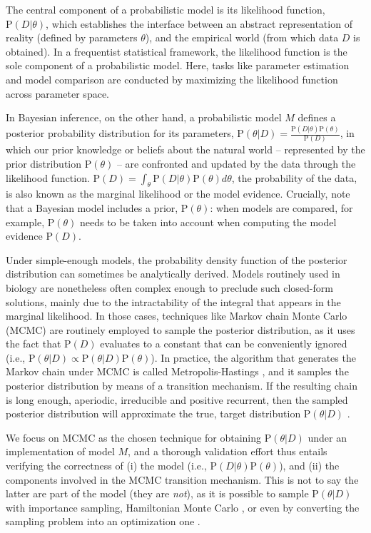 \documentclass[oneside]{article}
\begin{document}
The central component of a probabilistic model is its likelihood
function, $\text{P}(D|\theta)$, which establishes the
interface between an abstract representation of reality (defined by parameters $\theta$), and the
empirical world (from which data $D$ is obtained).
In a frequentist statistical framework, the likelihood function is the sole
component of a probabilistic model.
Here, tasks like parameter estimation and model comparison are conducted
by maximizing the likelihood function across parameter
space.

In Bayesian inference, on the other hand, a probabilistic model $M$
defines a posterior probability distribution for its parameters,
$\text{P}(\theta|D) = \frac{\text{P}(D|\theta)\text{P}(\theta)}{\text{P}(D)}$, in which our prior
knowledge or beliefs about the natural world -- represented by the prior
distribution $\text{P}(\theta)$ -- are confronted and updated by the data through the
likelihood function.
$\text{P}(D) = \int_\theta \text{P}(D|\theta)\text{P}(\theta)d\theta$, the probability of
the data, is also known as the marginal likelihood or the model
evidence.
Crucially, note that a Bayesian model includes a prior, $\text{P}(\theta)$:
when models are compared, for example, $\text{P}(\theta)$ needs to be taken
into account when computing the model evidence $\text{P}(D)$.

Under simple-enough models, the probability density function of the posterior distribution can sometimes be analytically
derived.
Models routinely used in biology are nonetheless often complex enough
to preclude such closed-form solutions, mainly due to the
intractability of the integral that appears in the marginal
likelihood.
In those cases, techniques like Markov chain Monte Carlo (MCMC) are
routinely employed to sample the posterior distribution, as it uses
the fact that $\text{P}(D)$ evaluates to a constant that can be
conveniently ignored (i.e., $\text{P}(\theta|D) \propto
\text{P}(\theta|D)\text{P}(\theta)$).
In practice, the algorithm that generates the Markov chain under MCMC is called
Metropolis-Hastings \citep{mh}, and it samples the posterior distribution by
means of a transition mechanism. 
If the resulting chain is long enough, aperiodic, irreducible and
positive recurrent, then the sampled posterior distribution will
approximate the true, target distribution $\text{P}(\theta|D)$
\citep{mau99,gelman}.

We focus on MCMC as the chosen technique for obtaining $\text{P}(\theta|D)$
under an implementation of model $M$,
and a thorough validation effort thus entails verifying the
correctness of (i) the model (i.e., $\text{P}(D|\theta)\text{P}(\theta)$), and (ii)
the components involved in the MCMC transition mechanism.
This is not to say the latter are part of the model (they are
\emph{not}), as it is possible to sample $\text{P}(\theta|D)$ with importance sampling, Hamiltonian
Monte Carlo \citep{hmc}, or even by converting the sampling problem into an
optimization one \citep{zhang18}.
\end{document}
